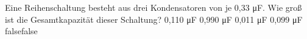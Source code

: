     {Eine Reihenschaltung besteht aus drei Kondensatoren von je 0,33 \si{\micro\farad}. Wie groß ist die Gesamtkapazität dieser Schaltung?}
    {0,110 \si{\micro\farad}}
    {0,990 \si{\micro\farad}}
    {0,011 \si{\micro\farad}}
    {0,099 \si{\micro\farad}}
    {false}{false}